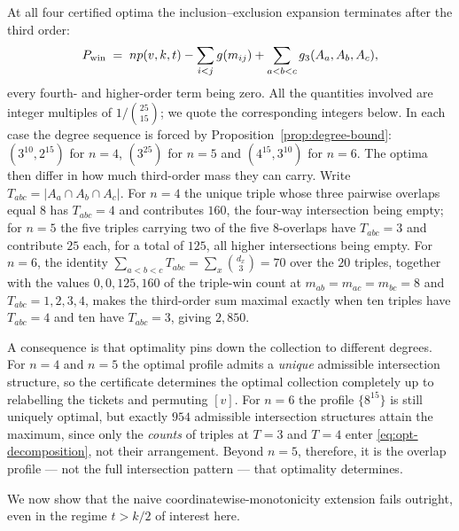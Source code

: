 \begin{remark}
  \label{rem:optimal-structure}
  At all four certified optima the inclusion--exclusion expansion
  terminates after the third order:
  \begin{equation}
    \label{eq:opt-decomposition}
    P_{\mathrm{win}}
    \;=\; np(v,k,t) - \sum_{i<j} g(m_{ij}) + \sum_{a<b<c} g_3(A_a,A_b,A_c),
  \end{equation}
  every fourth- and higher-order term being zero.  All the quantities
  involved are integer multiples of $1/\binom{25}{15}$; we quote the
  corresponding integers below.  In each case the degree sequence is
  forced by Proposition~\ref{prop:degree-bound}: $(3^{10}, 2^{15})$ for
  $n = 4$, $(3^{25})$ for $n = 5$ and $(4^{15}, 3^{10})$ for $n = 6$.
  The optima then differ in how much third-order mass they can carry.
  Write $T_{abc} = |A_a \cap A_b \cap A_c|$.  For $n = 4$ the unique
  triple whose three pairwise overlaps equal $8$ has $T_{abc} = 4$ and
  contributes $160$, the four-way intersection being empty; for $n = 5$
  the five triples carrying two of the five $8$-overlaps have $T_{abc} =
  3$ and contribute $25$ each, for a total of $125$, all higher
  intersections being empty.  For $n = 6$, the identity $\sum_{a<b<c}
  T_{abc} = \sum_x \binom{d_x}{3} = 70$ over the $20$ triples, together
  with the values $0, 0, 125, 160$ of the triple-win count at
  $m_{ab}=m_{ac}=m_{bc}=8$ and $T_{abc} = 1,2,3,4$, makes the third-order
  sum maximal exactly when ten triples have $T_{abc} = 4$ and ten have
  $T_{abc} = 3$, giving $2{,}850$.

  A consequence is that optimality pins down the collection to different
  degrees.  For $n = 4$ and $n = 5$ the optimal profile admits a
  \emph{unique} admissible intersection structure, so the certificate
  determines the optimal collection completely up to relabelling the
  tickets and permuting $[v]$.  For $n = 6$ the profile $\{8^{15}\}$ is
  still uniquely optimal, but exactly $954$ admissible intersection
  structures attain the maximum, since only the \emph{counts} of triples
  at $T = 3$ and $T = 4$ enter \eqref{eq:opt-decomposition}, not their
  arrangement.  Beyond $n = 5$, therefore, it is the overlap profile ---
  not the full intersection pattern --- that optimality determines.
\end{remark}

We now show that the naive coordinatewise-monotonicity extension fails
outright, even in the regime $t > k/2$ of interest here.

